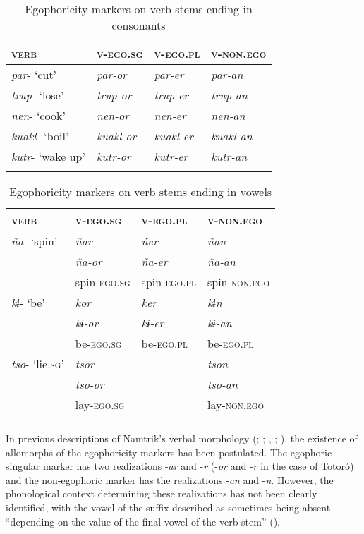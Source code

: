 \documentclass[output=paper]{langsci/langscibook}
\begin{document}
\begin{table}[t]
\begin{tabularx}{\textwidth}{XXXl}
\lsptoprule
\textsc{verb} & \textsc{v-ego.sg} & \textsc{v-ego.pl} & \textsc{v-non.ego}\\
\midrule
\textit{par}- ‘cut’ & \textit{par-or} & \textit{par-er} & \textit{par-an}\\
\textit{trup}- ‘lose’ & \textit{trup-or} & \textit{trup-er} & \textit{trup-an}\\
\textit{nen}- ‘cook’ & \textit{nen-or} & \textit{nen-er} & \textit{nen-an}\\
\textit{kuakl}- ‘boil’ & \textit{kuakl-or} & \textit{kuakl-er} & \textit{kuakl-an}\\
\textit{kutr}- ‘wake up’ & \textit{kutr-or} & \textit{kutr-er} & \textit{kutr-an}\\
\lspbottomrule
\end{tabularx}
\caption{Egophoricity markers on verb stems ending in consonants}
\label{tab:gg2}
\end{table}
\begin{table}[b]
\begin{tabularx}{\textwidth}{XXXl}
\lsptoprule
\textsc{verb} & \textsc{v-ego.sg} & \textsc{v-ego.pl} & \textsc{v-non.ego}\\
\midrule
\textit{ña}- ‘spin’ & \textit{ñar} & \textit{ñer} & \textit{ñan}\\
\tablevspace
& \textit{ña-or} & \textit{ña-er} & \textit{ña-an}\\
& spin-\textsc{ego.sg} & spin-\textsc{ego.pl} & spin-\textsc{non.ego}\\
\tablevspace
\textit{kɨ}- ‘be’ & \textit{kor} & \textit{ker} & \textit{kɨn}\\
& \textit{kɨ-or} & \textit{kɨ-er} & \textit{kɨ-an}\\
& be-\textsc{ego.sg} & be-\textsc{ego.pl} & be-\textsc{ego.pl}\\
\tablevspace
\textit{tso}- ‘lie.\textsc{sg}’ &  \textit{tsor} & – & \textit{tson}\\
& \textit{tso-or} & & \textit{tso-an}\\
& lay-\textsc{ego.sg} & & lay-\textsc{non.ego}\\
\lspbottomrule
\end{tabularx}
\caption{Egophoricity markers on verb stems ending in vowels}
\label{tab:gg3}
\end{table}

In previous descriptions of Namtrik’s verbal morphology (\citealt{Pabon1989}; \citealt{TrivinoGarzon1989}; \citealt{Vasquez1987}, \citeyear{Vasquez1988}; \citealt{Norcliffe2018}), the existence of allomorphs of the egophoricity markers has been postulated. The egophoric singular marker has two realizations -\textit{ar} and -\textit{r} (-\textit{or} and -\textit{r} in the case of Totoró) and the non-egophoric marker has the realizations -\textit{an} and -\textit{n}. However, the phonological context determining these realizations has not been clearly identified, with the vowel of the suffix described as sometimes being absent “depending on the value of the final vowel of the verb stem” (\citealt{Norcliffe2018}).
\end{document}
